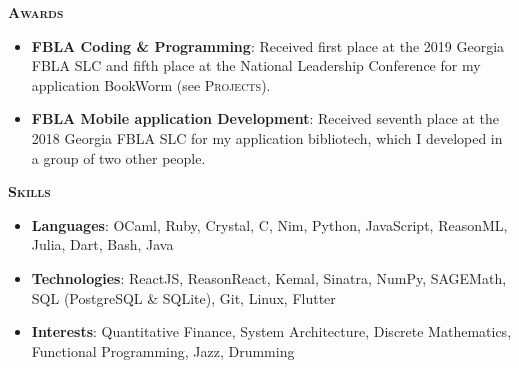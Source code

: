 \documentclass{article}
\begin{document}
  \vspace{10pt}

  {\large \textbf{\textsc{Awards}}}\hspace{5pt}\xrfill[.5ex]{.4pt}

  \vspace{3pt}

  \begin{itemize}
    \item \textbf{FBLA Coding \& Programming}: Received first place at the 2019 Georgia FBLA SLC and fifth place at the National Leadership Conference for my application BookWorm (see \textsc{Projects}).
    \item \textbf{FBLA Mobile application Development}: Received seventh place at the 2018 Georgia FBLA SLC for my application bibliotech, which I developed in a group of two other people.
  \end{itemize}

  \vspace{10pt}

  {\large \textbf{\textsc{Skills}}}\hspace{5pt}\xrfill[.5ex]{.4pt}

  \vspace{3pt}

  \begin{itemize}
    \item \textbf{Languages}: OCaml, Ruby, Crystal, C, Nim, Python, JavaScript, ReasonML, Julia, Dart, Bash, Java
    \item \textbf{Technologies}: ReactJS, ReasonReact, Kemal, Sinatra, NumPy, SAGEMath, SQL (PostgreSQL \& SQLite), Git, Linux, Flutter
    \item \textbf{Interests}: Quantitative Finance, System Architecture, Discrete Mathematics, Functional Programming, Jazz, Drumming
  \end{itemize}
\end{document}
